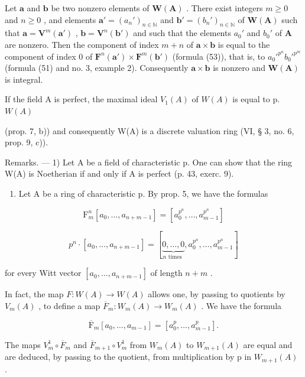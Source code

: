 Let \(\pmb{a}\) and \(\pmb{b}\) be two nonzero elements of \(\mathbf{W}(\mathbf{A})\) . There exist integers \(m \geqslant 0\) and \(n \geqslant 0\) , and elements \(\pmb{a}' = (a_n')_{n \in \mathbb{N}}\) and \(\pmb{b}' = (b_n')_{n \in \mathbb{N}}\) of \(\mathbf{W}(\mathbf{A})\) such that \(\pmb{a} = \mathbf{V}^m(\pmb{a}')\) , \(\pmb{b} = \mathbf{V}^n(\pmb{b}')\) and such that the elements \(a_0'\) and \(b_0'\) of \(\mathbf{A}\) are nonzero. Then the component of index \(m + n\) of \(\pmb{a} \times \pmb{b}\) is equal to the component of index 0 of \(\mathbf{F}^n(\pmb{a}') \times \mathbf{F}^m(\pmb{b}')\) (formula (53)), that is, to \(a_0'^{p^n} b_0'^{p^m}\) (formula (51) and no. 3, example 2). Consequently \(\pmb{a} \times \pmb{b}\) is nonzero and \(\mathbf{W}(\mathbf{A})\) is integral.

If the field A is perfect, the maximal ideal \(V_{1}(A)\) of \(W(A)\) is equal to p.\(W(A)\)

(prop. 7, b)) and consequently W(A) is a discrete valuation ring (VI, § 3, no. 6, prop. 9, c)).

Remarks. --- 1) Let A be a field of characteristic p. One can show that the ring W(A) is Noetherian if and only if A is perfect (p. 43, exerc. 9).

\begin{enumerate}
\def\labelenumi{\arabic{enumi})}
\setcounter{enumi}{1}
\tightlist
\item
  Let A be a ring of characteristic p. By prop. 5, we have the formulas
\end{enumerate}

\[
\mathrm{F} _ {m} ^ {n} [ a _ {0}, \dots , a _ {n + m - 1} ] = [ a _ {0} ^ {p ^ {n}}, \dots , a _ {m - 1} ^ {p ^ {n}} ]
\]

\[
p ^ {n} \cdot [ a _ {0}, \dots , a _ {n + m - 1} ] = [ \underbrace {0 , \dots , 0} _ {n \text {   times }}, a _ {0} ^ {p ^ {n}}, \dots , a _ {m - 1} ^ {p ^ {n}} ]
\]

for every Witt vector \([a_0, \dots, a_{n+m-1}]\) of length \(n + m\) .

In fact, the map \(F:W(A)\to W(A)\) allows one, by passing to quotients by \(V_{m}(A)\) , to define a map \(\overline{F}_{m}:W_{m}(A)\to W_{m}(A)\) . We have the formula

\[
\overline {{{{\mathrm{F}}}}} _ {m} \left[ a _ {0}, \dots , a _ {m - 1} \right] = \left[ a _ {0} ^ {p}, \dots , a _ {m - 1} ^ {p} \right].
\]

The maps \(V_{m}^{1} \circ \overline{F}_{m}\) and \(\overline{F}_{m+1} \circ V_{m}^{1}\) from \(W_{m}(A)\) to \(W_{m+1}(A)\) are equal and are deduced, by passing to the quotient, from multiplication by p in \(W_{m+1}(A)\) .


